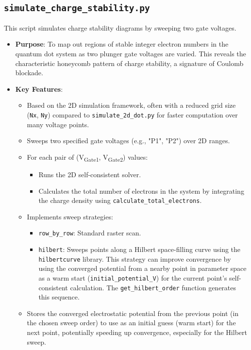 \documentclass{article}
\begin{document}
\subsection{\texttt{simulate\_charge\_stability.py}}
This script simulates charge stability diagrams by sweeping two gate voltages.
\begin{itemize}
	\item \textbf{Purpose}: To map out regions of stable integer electron numbers in the quantum dot system as two plunger gate voltages are varied. This reveals the characteristic honeycomb pattern of charge stability, a signature of Coulomb blockade.
	\item \textbf{Key Features}:
	      \begin{itemize}
		      \item Based on the 2D simulation framework, often with a reduced grid size (\texttt{Nx}, \texttt{Ny}) compared to \texttt{simulate\_2d\_dot.py} for faster computation over many voltage points.
		      \item Sweeps two specified gate voltages (e.g., "P1", "P2") over 2D ranges.
		      \item For each pair of (V\textsubscript{Gate1}, V\textsubscript{Gate2}) values:
		            \begin{itemize}
			            \item Runs the 2D self-consistent solver.
			            \item Calculates the total number of electrons in the system by integrating the charge density using \texttt{calculate\_total\_electrons}.
		            \end{itemize}
		      \item Implements sweep strategies:
		            \begin{itemize}
			            \item \texttt{row\_by\_row}: Standard raster scan.
			            \item \texttt{hilbert}: Sweeps points along a Hilbert space-filling curve using the \texttt{hilbertcurve} library. This strategy can improve convergence by using the converged potential from a nearby point in parameter space as a warm start (\texttt{initial\_potential\_V}) for the current point's self-consistent calculation. The \texttt{get\_hilbert\_order} function generates this sequence.
		            \end{itemize}
		      \item Stores the converged electrostatic potential from the previous point (in the chosen sweep order) to use as an initial guess (warm start) for the next point, potentially speeding up convergence, especially for the Hilbert sweep.

\end{itemize}
\end{itemize}
\end{document}
